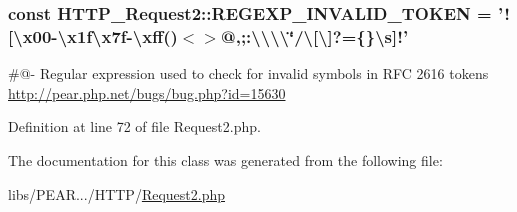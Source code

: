 \hypertarget{classHTTP__Request2_a73691a6fc7003599b47be20a8c728bbf}{
\subsubsection[{R\-E\-G\-E\-X\-P\-\_\-\-I\-N\-V\-A\-L\-I\-D\-\_\-\-T\-O\-K\-E\-N}]{\setlength{\rightskip}{0pt plus 5cm}const H\-T\-T\-P\-\_\-\-Request2\-::\-R\-E\-G\-E\-X\-P\-\_\-\-I\-N\-V\-A\-L\-I\-D\-\_\-\-T\-O\-K\-E\-N = '!\mbox{[}\textbackslash{}x00-\/\textbackslash{}x1f\textbackslash{}x7f-\/\textbackslash{}xff()$<$$>$@,;\-:\textbackslash{}\textbackslash{}\textbackslash{}\textbackslash{}\char`\"{}/\textbackslash{}\mbox{[}\textbackslash{}\mbox{]}?=\{\}\textbackslash{}s\mbox{]}!'}}\label{classHTTP__Request2_a73691a6fc7003599b47be20a8c728bbf}
\#@-\/ Regular expression used to check for invalid symbols in R\-F\-C 2616 tokens \hyperlink{}{http\-://pear.\-php.\-net/bugs/bug.\-php?id=15630}

Definition at line 72 of file Request2.\-php.



The documentation for this class was generated from the following file\-:\begin{DoxyCompactItemize}
\item 
libs/\-P\-E\-A\-R.../\-H\-T\-T\-P/\hyperlink{Request2_8php}{Request2.\-php}\end{DoxyCompactItemize}
